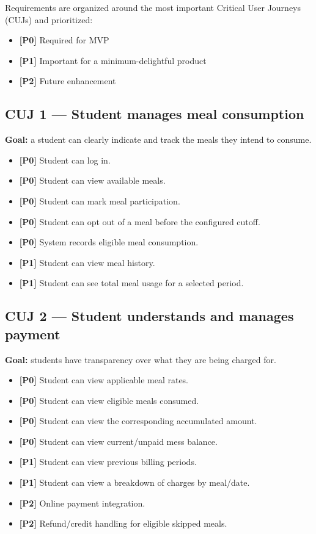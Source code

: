 \documentclass[12pt,a4paper]{article}
\newcommand{\priority}[1]{\textbf{[#1]}}
\begin{document}
Requirements are organized around the most important Critical User Journeys
(CUJs) and prioritized:

\begin{itemize}
    \item \priority{P0} Required for MVP
    \item \priority{P1} Important for a minimum-delightful product
    \item \priority{P2} Future enhancement
\end{itemize}

\subsection{CUJ 1 --- Student manages meal consumption}

\textbf{Goal:} a student can clearly indicate and track the meals they intend
to consume.

\begin{itemize}
    \item \priority{P0} Student can log in.
    \item \priority{P0} Student can view available meals.
    \item \priority{P0} Student can mark meal participation.
    \item \priority{P0} Student can opt out of a meal before the configured cutoff.
    \item \priority{P0} System records eligible meal consumption.
    \item \priority{P1} Student can view meal history.
    \item \priority{P1} Student can see total meal usage for a selected period.
\end{itemize}

\subsection{CUJ 2 --- Student understands and manages payment}

\textbf{Goal:} students have transparency over what they are being charged for.

\begin{itemize}
    \item \priority{P0} Student can view applicable meal rates.
    \item \priority{P0} Student can view eligible meals consumed.
    \item \priority{P0} Student can view the corresponding accumulated amount.
    \item \priority{P0} Student can view current/unpaid mess balance.
    \item \priority{P1} Student can view previous billing periods.
    \item \priority{P1} Student can view a breakdown of charges by meal/date.
    \item \priority{P2} Online payment integration.
    \item \priority{P2} Refund/credit handling for eligible skipped meals.
\end{itemize}
\end{document}
